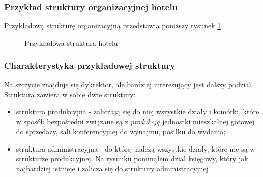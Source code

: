 \documentclass[a4paper,onecolumn,oneside,11pt,wide,floatssmall]{mwrep}
\theoremstyle{definition}
\theoremstyle{plain}%
\theoremstyle{remark}
\begin{document}
\subsubsection{Przykład struktury organizacyjnej hotelu}
Przykładową strukturę organizacyjną przedstawia poniższy rysunek 
\ref{fig:struktura-hotelu}.

\begin{figure}[H]
  \begin{center}
  \end{center}
  \caption{Przykładowa struktura hotelu}
  \label{fig:struktura-hotelu}
\end{figure}

\subsubsection{Charakterystyka przykładowej struktury}
Na szczycie znajduje się dykrektor, ale bardziej interesujący jest dalszy 
podział. Struktura zawiera w sobie dwie struktury:
\begin{itemize}
  \item struktura produkcyjna - zaliczają się do niej wszystkie działy i 
  komórki, które w sposób bezpośredni związane są z \emph{produkcją}
  jednostki mieszkalnej gotowej do sprzedaży, sali konferencyjnej do 
  wynajmu, posiłku do wydania;
  \item struktura administracyjna - do której należą wszystkie działy, które
   nie są w strukturze produkcyjnej. Na rysunku pominąłem dział księgowy, 
   który jak najbardziej istnieje i zalicza się do struktury administracyjnej
   .
\end{itemize}
\end{document}
